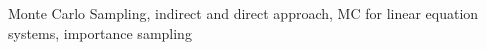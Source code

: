 Monte Carlo Sampling, indirect and direct approach, MC for linear equation systems, importance sampling